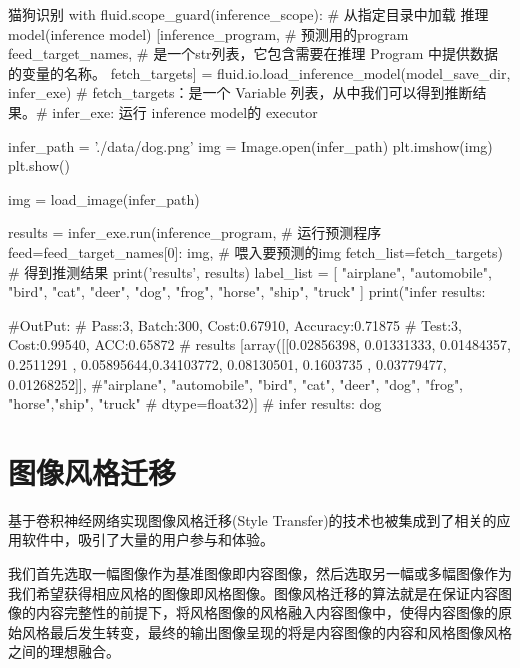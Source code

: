 \documentclass[openbib]{article}
\begin{document}
\begin{Python}{猫狗识别}
with fluid.scope_guard(inference_scope):
	# 从指定目录中加载 推理model(inference model)
	[inference_program,  # 预测用的program
   	 feed_target_names,  # 是一个str列表，它包含需要在推理 Program 中提供数据的变量的名称。
	 fetch_targets] = fluid.io.load_inference_model(model_save_dir, infer_exe)   
	 # fetch_targets：是一个 Variable 列表，从中我们可以得到推断结果。# infer_exe: 运行 inference model的 executor
	
	infer_path = './data/dog.png'
	img = Image.open(infer_path)
	plt.imshow(img)
	plt.show()
	
	img = load_image(infer_path)
	
	results = infer_exe.run(inference_program,  # 运行预测程序
					feed={feed_target_names[0]: img},  # 喂入要预测的img
						fetch_list=fetch_targets)  # 得到推测结果
	print('results', results)
	label_list = [
		"airplane", "automobile", "bird", "cat", "deer", "dog", "frog", "horse",
		"ship", "truck"
	]
	print("infer results: %
	
#OutPut:
#		Pass:3, Batch:300, Cost:0.67910, Accuracy:0.71875
#		Test:3, Cost:0.99540, ACC:0.65872
#		results [array([[0.02856398, 0.01331333, 0.01484357, 0.2511291 , 0.05895644,0.34103772, 0.08130501, 0.1603735 , 0.03779477, 0.01268252]],
#"airplane", "automobile", "bird", "cat", "deer", "dog", "frog", "horse","ship", "truck"
#				dtype=float32)]
#		infer results: dog
\end{Python}
\section{图像风格迁移}
基于卷积神经网络实现图像风格迁移(Style Transfer)的技术也被集成到了相关的应用软件中，吸引了大量的用户参与和体验。

我们首先选取一幅图像作为基准图像即内容图像，然后选取另一幅或多幅图像作为我们希望获得相应风格的图像即风格图像。图像风格迁移的算法就是在保证内容图像的内容完整性的前提下，将风格图像的风格融入内容图像中，使得内容图像的原始风格最后发生转变，最终的输出图像呈现的将是内容图像的内容和风格图像风格之间的理想融合。
\end{document}
